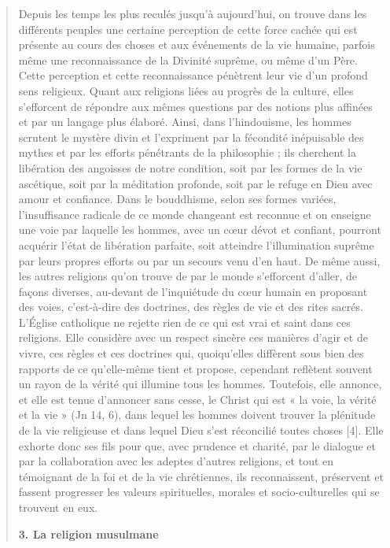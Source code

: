 \begin{quote}
Depuis les temps les plus reculés jusqu’à aujourd’hui, on trouve dans les différents peuples une certaine perception de cette force cachée qui est présente au cours des choses et aux événements de la vie humaine, parfois même une reconnaissance de la Divinité suprême, ou même d’un Père. Cette perception et cette reconnaissance pénètrent leur vie d’un profond sens religieux. Quant aux religions liées au progrès de la culture, elles s’efforcent de répondre aux mêmes questions par des notions plus affinées et par un langage plus élaboré. Ainsi, dans l’hindouisme, les hommes scrutent le mystère divin et l’expriment par la fécondité inépuisable des mythes et par les efforts pénétrants de la philosophie ; ils cherchent la libération des angoisses de notre condition, soit par les formes de la vie ascétique, soit par la méditation profonde, soit par le refuge en Dieu avec amour et confiance. Dans le bouddhisme, selon ses formes variées, l’insuffisance radicale de ce monde changeant est reconnue et on enseigne une voie par laquelle les hommes, avec un cœur dévot et confiant, pourront acquérir l’état de libération parfaite, soit atteindre l’illumination suprême par leurs propres efforts ou par un secours venu d’en haut. De même aussi, les autres religions qu’on trouve de par le monde s’efforcent d’aller, de façons diverses, au-devant de l’inquiétude du cœur humain en proposant des voies, c’est-à-dire des doctrines, des règles de vie et des rites sacrés.
L’Église catholique ne rejette rien de ce qui est vrai et saint dans ces religions. Elle considère avec un respect sincère ces manières d’agir et de vivre, ces règles et ces doctrines qui, quoiqu’elles diffèrent sous bien des rapports de ce qu’elle-même tient et propose, cependant reflètent souvent un rayon de la vérité qui illumine tous les hommes. Toutefois, elle annonce, et elle est tenue d’annoncer sans cesse, le Christ qui est « la voie, la vérité et la vie » (Jn 14, 6), dans lequel les hommes doivent trouver la plénitude de la vie religieuse et dans lequel Dieu s’est réconcilié toutes choses [4]. Elle exhorte donc ses fils pour que, avec prudence et charité, par le dialogue et par la collaboration avec les adeptes d’autres religions, et tout en témoignant de la foi et de la vie chrétiennes, ils reconnaissent, préservent et fassent progresser les valeurs spirituelles, morales et socio-culturelles qui se trouvent en eux.


\textbf{3. La religion musulmane}



\end{quote}
